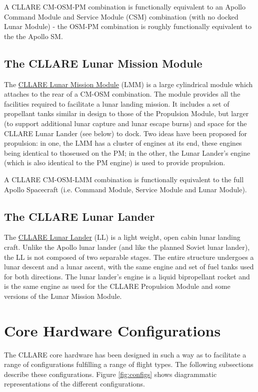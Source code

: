 \documentclass{report}
\begin{document}
A CLLARE CM-OSM-PM combination is functionally equivalent to an Apollo Command Module and Service Module (CSM) combination (with no docked Lunar Module) - the OSM-PM combination is roughly functionally equivalent to the the Apollo SM.

\subsection{The CLLARE Lunar Mission Module}

The \href{http://cstart.org/wiki/CLLARE_Lunar_Mission_Module}{CLLARE Lunar Mission Module} (LMM) is a large cylindrical module which attaches to the rear of a CM-OSM combination.  The module provides all the facilities required to facilitate a lunar landing mission.  It includes a set of propellant tanks similar in design to those of the Propulsion Module, but larger (to support additional lunar capture and lunar escape burns) and space for the CLLARE Lunar Lander (see below) to dock.  Two ideas have been proposed for propulsion: in one, the LMM has a cluster of engines at its end, these engines being identical to thoseused on the PM; in the other, the Lunar Lander's engine (which is also identical to the PM engine) is used to provide propulsion.

A CLLARE CM-OSM-LMM combination is functionally equivalent to the full Apollo Spacecraft (i.e. Command Module, Service Module and Lunar Module).

\subsection{The CLLARE Lunar Lander}

The \href{http://cstart.org/wiki/CLLARE_Lunar_Lander}{CLLARE Lunar Lander} (LL) is a light weight, open cabin lunar landing craft.  Unlike the Apollo lunar lander (and like the planned Soviet lunar lander), the LL is not composed of two separable stages.  The entire structure undergoes a lunar descent and a lunar ascent, with the same engine and set of fuel tanks used for both directions.  The lunar lander's engine is a liquid bipropellant rocket and is the same engine as used for the CLLARE Propulsion Module and some versions of the Lunar Mission Module.

\section{Core Hardware Configurations}

The CLLARE core hardware has been designed in such a way as to facilitate a range of configurations fulfilling a range of flight types.  The following subsections describe these configurations.  Figure \ref{fig:configs} shows diagrammatic representations of the different configurations.
\end{document}
